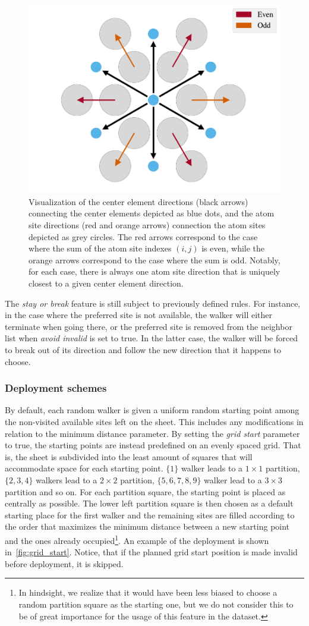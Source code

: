 \begin{figure}[!htb]
  \centering
  \includegraphics[width=0.5\linewidth]{figures/system/stay_or_break.pdf}
  \caption{Visualization of the center element directions (black arrows) connecting the center elements depicted as blue dots, and the atom site directions (red and orange arrows) connection the atom sites depicted as grey circles. The red arrows correspond to the case where the sum of the atom site indexes $(i,j)$ is even, while the orange arrows correspond to the case where the sum is odd. Notably, for each case, there is always one atom site direction that is uniquely closest to a given center element direction.}
  \label{fig:stay_or_break}
\end{figure}

The \textit{stay or break} feature is still subject to previously defined rules.
For instance, in the case where the preferred site is not available, the walker
will either terminate when going there, or the preferred site is removed from
the neighbor list when \textit{avoid invalid} is set to true. In the latter
case, the walker will be forced to break out of its direction and follow the new
direction that it happens to choose.


\subsubsection{Deployment schemes} %
By default, each random walker is given a uniform random starting point among
the non-visited available sites left on the sheet. This includes any
modifications in relation to the minimum distance parameter. By setting the
\textit{grid start} parameter to true, the starting points are instead
predefined on an evenly spaced grid. That is, the sheet is subdivided into the
least amount of squares that will accommodate space for each starting point. $\{1\}$
walker leads to a $1\times 1$ partition, $\{2,3,4\}$ walkers lead to a $2\times
2$ partition, $\{5,6,7,8,9\}$ walker lead to a $3\times 3$ partition and so on.
For each partition square, the starting point is placed as centrally as
possible. The lower left partition square is then chosen as a default starting
place for the first walker and the remaining sites are filled according to the
order that maximizes the minimum distance between a new starting point and the
ones already occupied\footnote{In hindsight, we realize that it would have been less biased to
choose a random partition square as the starting one, but we do not consider
this to be of great importance for the usage of this feature in the dataset.}.
An example of the deployment is shown in~\cref{fig:grid_start}. Notice, that if the planned grid start position is made invalid before deployment, it is skipped. 



